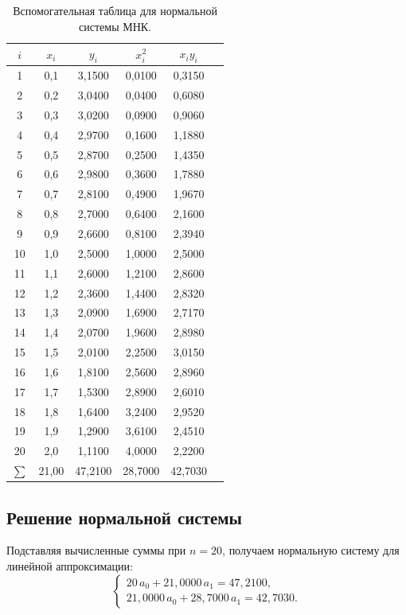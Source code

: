 \documentclass[a4paper, final]{article}
\begin{document}
\begin{table}[h!]
\centering
\small
\begin{tabular}{|c|c|c|c|c|c|}
\hline
$i$ & $x_i$ & $y_i$ & $x_i^2$ & $x_i y_i$ \\
\hline
1  & 0,1 & 3,1500 & 0,0100 & 0,3150 \\
2  & 0,2 & 3,0400 & 0,0400 & 0,6080 \\
3  & 0,3 & 3,0200 & 0,0900 & 0,9060 \\
4  & 0,4 & 2,9700 & 0,1600 & 1,1880 \\
5  & 0,5 & 2,8700 & 0,2500 & 1,4350 \\
6  & 0,6 & 2,9800 & 0,3600 & 1,7880 \\
7  & 0,7 & 2,8100 & 0,4900 & 1,9670 \\
8  & 0,8 & 2,7000 & 0,6400 & 2,1600 \\
9  & 0,9 & 2,6600 & 0,8100 & 2,3940 \\
10 & 1,0 & 2,5000 & 1,0000 & 2,5000 \\
11 & 1,1 & 2,6000 & 1,2100 & 2,8600 \\
12 & 1,2 & 2,3600 & 1,4400 & 2,8320 \\
13 & 1,3 & 2,0900 & 1,6900 & 2,7170 \\
14 & 1,4 & 2,0700 & 1,9600 & 2,8980 \\
15 & 1,5 & 2,0100 & 2,2500 & 3,0150 \\
16 & 1,6 & 1,8100 & 2,5600 & 2,8960 \\
17 & 1,7 & 1,5300 & 2,8900 & 2,6010 \\
18 & 1,8 & 1,6400 & 3,2400 & 2,9520 \\
19 & 1,9 & 1,2900 & 3,6100 & 2,4510 \\
20 & 2,0 & 1,1100 & 4,0000 & 2,2200 \\
\hline
$\sum$ & 21,00 & 47,2100 & 28,7000 & 42,7030 \\
\hline
\end{tabular}
\caption{Вспомогательная таблица для нормальной системы МНК.}
\label{tab:aux}
\end{table}

\subsection{Решение нормальной системы}

Подставляя вычисленные суммы при $n = 20$, получаем нормальную систему для
линейной аппроксимации:
\[
\begin{cases}
20\,a_0 + 21{,}0000\,a_1 = 47{,}2100, \\
21{,}0000\,a_0 + 28{,}7000\,a_1 = 42{,}7030.
\end{cases}
\]
\end{document}
